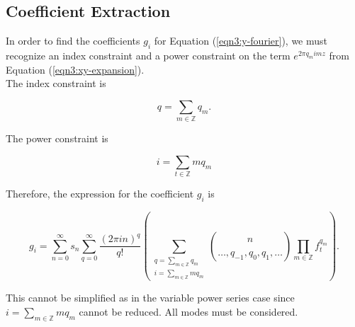\documentclass{article}
\begin{document}
    \subsection{Coefficient Extraction}

    In order to find the coefficients $g_i$ for Equation (\ref{eqn3:y-fourier}), we must recognize an index constraint and a power constraint on the term $e^{2\pi q_m imz}$ from Equation (\ref{eqn3:xy-expansion}).\\

    The index constraint is

    \begin{equation}
        q = \sum_{m \in \mathbb{Z}} q_m.
    \end{equation}

    The power constraint is

    \begin{equation}
        i = \sum_{t \in \mathbb{Z}} m q_m
    \end{equation}

    Therefore, the expression for the coefficient $g_i$ is

    \begin{equation}
        g_i = \sum_{n=0}^{\infty} s_n \sum_{q=0}^{\infty} \frac{(2\pi in)^q}{q!} \left(\sum_{\substack{q = \sum_{m \in \mathbb{Z}} q_m \\ i=\sum_{m \in \mathbb{Z}} m q_m}} \binom{n}{\ldots, q_{-1}, q_{0}, q_{1}, \dots} \prod_{m \in \mathbb{Z}}f_t^{q_m} \right).
    \end{equation}

    This cannot be simplified as in the variable power series case since $i = \sum_{m \in \mathbb{Z}} m q_m$ cannot be reduced. All modes must be considered.
\end{document}
